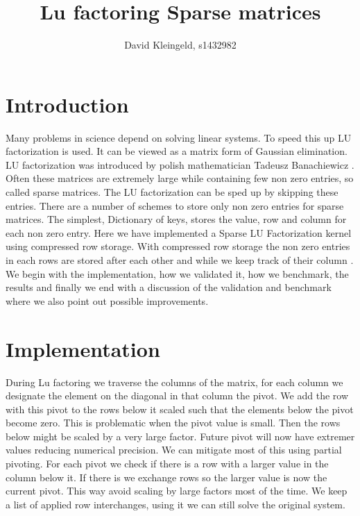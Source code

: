 \documentclass[10pt]{article}
\author{David Kleingeld, s1432982}
\title{Lu factoring Sparse matrices}
\begin{document}

\maketitle

\section{Introduction}
Many problems in science depend on solving linear systems. To speed this up LU factorization is used. It can be viewed as a matrix form of Gaussian elimination. LU factorization was introduced by polish mathematician Tadeusz Banachiewicz \cite{lu}.
Often these matrices are extremely large while containing few non zero entries, so called sparse matrices. The LU factorization can be sped up by skipping these entries. There are a number of schemes to store only non zero entries for sparse matrices. The simplest, Dictionary of keys, stores the value, row and column for each non zero entry. Here we have implemented a Sparse LU Factorization kernel using compressed row storage. With compressed row storage the non zero entries in each rows are stored after each other and while we keep track of their column \cite{compressedRowStorage}. We begin with the implementation, how we validated it, how we benchmark, the results and finally we end with a discussion of the validation and benchmark where we also point out possible improvements. 

\section{Implementation}

During Lu factoring we traverse the columns of the matrix, for each column we designate the element on the diagonal in that column the pivot. We add the row with this pivot to the rows below it scaled such that the elements below the pivot become zero. This is problematic when the pivot value is small. Then the rows below might be scaled by a very large factor. Future pivot will now have extremer values reducing numerical precision. 
We can mitigate most of this using partial pivoting. For each pivot we check if there is a row with a larger value in the column below it. If there is we exchange rows so the larger value is now the current pivot. This way avoid scaling by large factors most of the time. We keep a list of applied row interchanges, using it we can still solve the original system.
\end{document}
